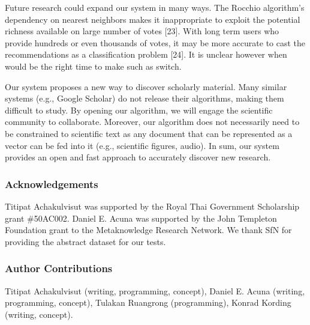\documentclass[a4paper]{article}
\begin{document}
Future research could expand our system in many ways. The Rocchio algorithm’s dependency on nearest neighbors makes it inappropriate to exploit the potential richness available on large number of votes [23]. With long term users who provide hundreds or even thousands of votes, it may be more accurate to cast the recommendations as a classification problem [24]. It is unclear however when would be the right time to make such as switch.

Our system proposes a new way to discover scholarly material. Many similar systems (e.g., Google Scholar) do not release their algorithms, making them difficult to study. By opening our algorithm, we will engage the scientific community to collaborate. Moreover, our algorithm does not necessarily need to be constrained to scientific text as any document that can be represented as a vector can be fed into it (e.g., scientific figures, audio). In sum, our system provides an open and fast approach to accurately discover new research.


\subsubsection*{Acknowledgements}

Titipat Achakulvisut was supported by the Royal Thai Government Scholarship grant \#50AC002. Daniel E. Acuna was supported by the John Templeton Foundation grant to the Metaknowledge Research Network. We thank SfN for providing the abstract dataset for our tests.

\subsubsection*{Author Contributions}

Titipat Achakulvisut (writing, programming, concept), Daniel E. Acuna (writing, programming, concept), Tulakan Ruangrong (programming), Konrad Kording (writing, concept).
\end{document}
